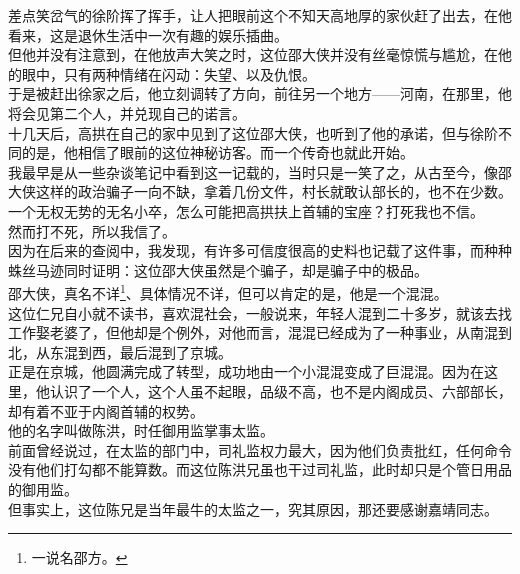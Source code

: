 \begin{multicols}{\theparacolNo}
差点笑岔气的徐阶挥了挥手，让人把眼前这个不知天高地厚的家伙赶了出去，在他看来，这是退休生活中一次有趣的娱乐插曲。\\

但他并没有注意到，在他放声大笑之时，这位邵大侠并没有丝毫惊慌与尴尬，在他的眼中，只有两种情绪在闪动：失望、以及仇恨。\\

于是被赶出徐家之后，他立刻调转了方向，前往另一个地方——河南，在那里，他将会见第二个人，并兑现自己的诺言。\\

十几天后，高拱在自己的家中见到了这位邵大侠，也听到了他的承诺，但与徐阶不同的是，他相信了眼前的这位神秘访客。而一个传奇也就此开始。\\

我最早是从一些杂谈笔记中看到这一记载的，当时只是一笑了之，从古至今，像邵大侠这样的政治骗子一向不缺，拿着几份文件，村长就敢认部长的，也不在少数。\\

一个无权无势的无名小卒，怎么可能把高拱扶上首辅的宝座？打死我也不信。\\

然而打不死，所以我信了。\\

因为在后来的查阅中，我发现，有许多可信度很高的史料也记载了这件事，而种种蛛丝马迹同时证明：这位邵大侠虽然是个骗子，却是骗子中的极品。\\

邵大侠，真名不详\footnote{一说名邵方。}、具体情况不详，但可以肯定的是，他是一个混混。\\

这位仁兄自小就不读书，喜欢混社会，一般说来，年轻人混到二十多岁，就该去找工作娶老婆了，但他却是个例外，对他而言，混混已经成为了一种事业，从南混到北，从东混到西，最后混到了京城。\\

正是在京城，他圆满完成了转型，成功地由一个小混混变成了巨混混。因为在这里，他认识了一个人，这个人虽不起眼，品级不高，也不是内阁成员、六部部长，却有着不亚于内阁首辅的权势。\\

他的名字叫做陈洪，时任御用监掌事太监。\\

前面曾经说过，在太监的部门中，司礼监权力最大，因为他们负责批红，任何命令没有他们打勾都不能算数。而这位陈洪兄虽也干过司礼监，此时却只是个管日用品的御用监。\\

但事实上，这位陈兄是当年最牛的太监之一，究其原因，那还要感谢嘉靖同志。\\


\end{multicols}
